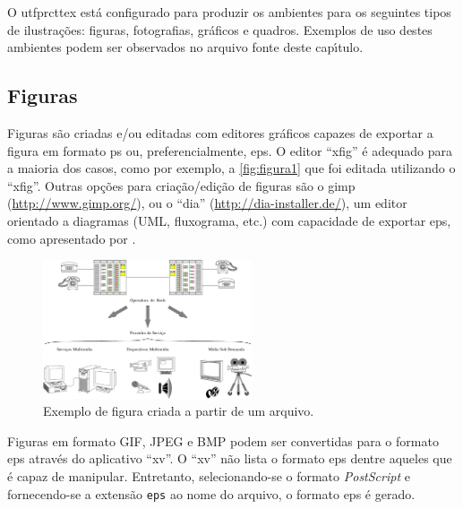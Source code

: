 O \gls{utfprcttex} est\'a configurado para produzir os ambientes para os seguintes tipos de ilustra\c{c}\~oes: figuras, fotografias, gr\'aficos e quadros. Exemplos de uso destes ambientes podem ser observados no arquivo fonte deste cap\'{\i}tulo.

\subsection{Figuras}\label{sec:figuras}

Figuras s\~ao criadas e/ou editadas com editores gr\'aficos capazes de exportar a figura em formato \gls{ps} ou, preferencialmente, \gls{eps}. O editor ``xfig'' \'e adequado para a maioria dos casos, como por exemplo, a \autoref{fig:figura1} que foi editada utilizando o ``xfig''. Outras op\c{c}\~oes para cria\c{c}\~ao/edi\c{c}\~ao de figuras s\~ao o \gls{gimp} (\url{http://www.gimp.org/}), ou o ``dia'' (\url{http://dia-installer.de/}), um editor orientado a diagramas (UML, fluxograma, etc.) com capacidade de exportar \gls{eps}, como apresentado por \citet{Larsson2003}.

\begin{figure}[Htb]%
\captionsetup{width=0.55\textwidth}%
\caption{Exemplo de figura criada a partir de um arquivo.}%
\label{fig:figura1}%
\includegraphics[width=0.55\textwidth]{./CapituloExemplo/figura1}%
\end{figure}

Figuras em formato GIF, JPEG e BMP podem ser convertidas para o formato \gls{eps} atrav\'es do aplicativo ``xv''. O ``xv'' n\~ao lista o formato \gls{eps} dentre aqueles que \'e capaz de manipular. Entretanto, selecionando-se o formato \textit{PostScript} e fornecendo-se a extens\~ao \texttt{eps} ao nome do arquivo, o formato \gls{eps} \'e gerado.

